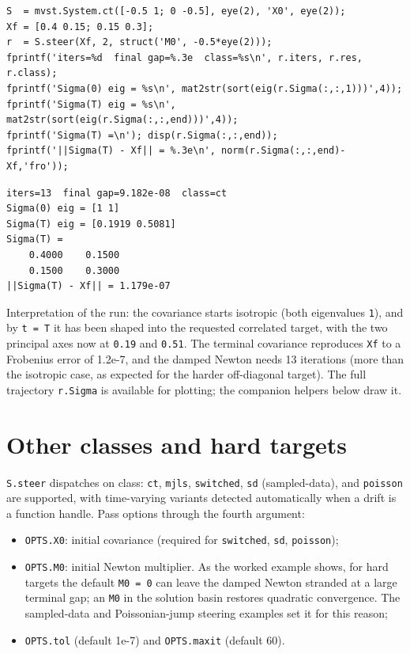 \documentclass[11pt,oneside]{report}
\newcommand{\code}[1]{\texttt{#1}}
\providecommand{\tightlist}{\setlength{\itemsep}{0pt}\setlength{\parskip}{0pt}}
\begin{document}
\begin{lstlisting}[style=matlabstyle]
S  = mvst.System.ct([-0.5 1; 0 -0.5], eye(2), 'X0', eye(2));
Xf = [0.4 0.15; 0.15 0.3];
r  = S.steer(Xf, 2, struct('M0', -0.5*eye(2)));
fprintf('iters=%d  final gap=%.3e  class=%s\n', r.iters, r.res, r.class);
fprintf('Sigma(0) eig = %s\n', mat2str(sort(eig(r.Sigma(:,:,1)))',4));
fprintf('Sigma(T) eig = %s\n', mat2str(sort(eig(r.Sigma(:,:,end)))',4));
fprintf('Sigma(T) =\n'); disp(r.Sigma(:,:,end));
fprintf('||Sigma(T) - Xf|| = %.3e\n', norm(r.Sigma(:,:,end)-Xf,'fro'));
\end{lstlisting}

\begin{lstlisting}[style=outputstyle]
iters=13  final gap=9.182e-08  class=ct
Sigma(0) eig = [1 1]
Sigma(T) eig = [0.1919 0.5081]
Sigma(T) =
    0.4000    0.1500
    0.1500    0.3000
||Sigma(T) - Xf|| = 1.179e-07
\end{lstlisting}

Interpretation of the run: the covariance starts isotropic (both eigenvalues \code{1}), and by
\code{t = T} it has been shaped into the requested correlated target, with the two
principal axes now at \code{0.19} and \code{0.51}. The terminal covariance reproduces
\code{Xf} to a Frobenius error of 1.2e-7, and the damped Newton needs 13 iterations
(more than the isotropic case, as expected for the harder off-diagonal target).
The full trajectory \code{r.Sigma} is available for plotting; the companion helpers
below draw it.

\hypertarget{other-classes-and-hard-targets}{%
\section{Other classes and hard targets}\label{other-classes-and-hard-targets}}

\code{S.steer} dispatches on class: \code{ct}, \code{mjls}, \code{switched}, \code{sd} (sampled-data),
and \code{poisson} are supported, with time-varying variants detected automatically
when a drift is a function handle. Pass options through the fourth argument:

\begin{itemize}
\tightlist
\item
  \code{OPTS.X0}: initial covariance (required for \code{switched}, \code{sd}, \code{poisson});
\item
  \code{OPTS.M0}: initial Newton multiplier. As the worked example shows, for hard
  targets the default \code{M0 = 0} can leave the damped Newton stranded at a large
  terminal gap; an \code{M0} in the solution basin restores quadratic convergence.
  The sampled-data and Poissonian-jump steering examples set it for this reason;
\item
  \code{OPTS.tol} (default 1e-7) and \code{OPTS.maxit} (default 60).
\end{itemize}
\end{document}
